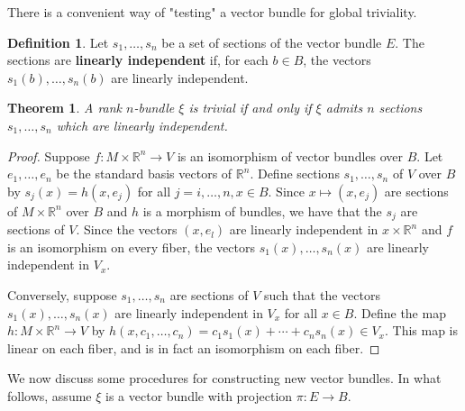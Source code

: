 \documentclass{article}
\newtheorem{theorem}{Theorem}[section]
\theoremstyle{definition}
\newtheorem{defn}{Definition}[section]
\newcommand{\R}{\mathbb{R}}
\begin{document}
There is a convenient way of "testing" a vector bundle for global triviality. 
\begin{defn}
Let $s_{1},\dots,s_{n}$ be a set of sections of the vector bundle $E$. The sections are \textbf{linearly independent} if, for each $b\in B$, the vectors $s_{1}(b),\dots,s_{n}(b)$ are linearly independent. 
\end{defn}
\begin{theorem}
A rank $n$-bundle $\xi$ is trivial if and only if $\xi$ admits $n$ sections $s_{1},\dots,s_{n}$ which are linearly independent. 
\end{theorem}
\begin{proof}
Suppose $f:M\times\R^{n}\rightarrow V$ is an isomorphism of vector bundles over $B$. Let $e_{1},\dots,e_{n}$ be the standard basis vectors of $\R^{n}.$ Define sections $s_{1},\dots,s_{n}$ of $V$ over $B$ by $s_{j}(x)=h(x,e_{j})$ for all $j=i,\dots,n,x\in B$. Since $x\mapsto(x,e_{j})$ are sections of $M\times\R^{n}$ over $B$ and $h$ is a morphism of bundles, we have that the $s_{j}$ are sections of $V$. Since the vectors $(x,e_{l})$ are linearly independent in $x\times\R^{n}$ and $f$ is an isomorphism on every fiber, the vectors $s_{1}(x),\dots,s_{n}(x)$ are linearly independent in $V_{x}.$

Conversely, suppose $s_{1},\dots,s_{n}$ are sections of $V$ such that the vectors $s_{1}(x),\dots,s_{n}(x)$ are linearly independent in $V_{x}$ for all $x\in B$. Define the map $h:M\times \R^{n}\rightarrow V$ by $h(x,c_{1},\dots,c_{n})=c_{1}s_{1}(x)+\cdots+c_{n}s_{n}(x)\in V_{x}.$ This map is linear on each fiber, and is in fact an isomorphism on each fiber. 
\end{proof}

We now discuss some procedures for constructing new vector bundles. In what follows, assume $\xi$ is a vector bundle with projection $\pi:E\rightarrow B$.
\end{document}
